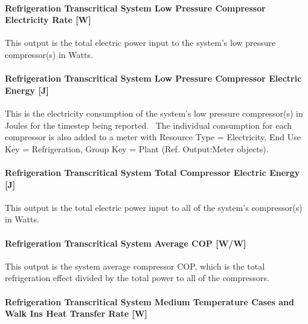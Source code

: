 \paragraph{Refrigeration Transcritical System Low Pressure Compressor Electricity Rate {[}W{]}}\label{refrigeration-transcritical-system-low-pressure-compressor-electric-power-w}

This output is the total electric power input to the system's low pressure compressor(s) in Watts.

\paragraph{Refrigeration Transcritical System Low Pressure Compressor Electric Energy {[}J{]}}\label{refrigeration-transcritical-system-low-pressure-compressor-electric-energy-j}

This is the electricity consumption of the system's low pressure compressor(s) in Joules for the timestep being reported.~ The individual consumption for each compressor is also added to a meter with Resource Type = Electricity, End Use Key = Refrigeration, Group Key = Plant (Ref. Output:Meter objects).

\paragraph{Refrigeration Transcritical System Total Compressor Electric Energy {[}J{]}}\label{refrigeration-transcritical-system-total-compressor-electric-energy-j}

This output is the total electric power input to all of the system's compressor(s) in Watts.

\paragraph{Refrigeration Transcritical System Average COP {[}W/W{]}}\label{refrigeration-transcritical-system-average-cop-ww}

This output is the system average compressor COP, which is the total refrigeration effect divided by the total power to all of the compressors.

\paragraph{Refrigeration Transcritical System Medium Temperature Cases and Walk Ins Heat Transfer Rate {[}W{]}}\label{refrigeration-transcritical-system-medium-temperature-cases-and-walk-ins-heat-transfer-rate-w}

